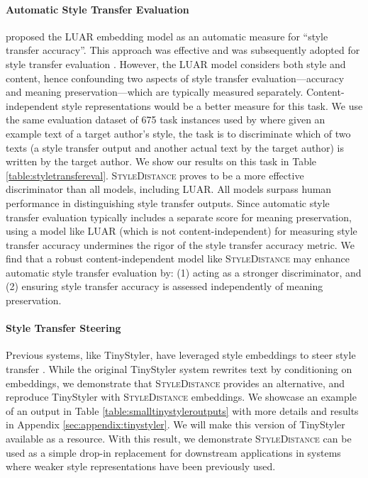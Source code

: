 \paragraph{Automatic Style Transfer Evaluation} \citet{lowresourceauthorshipstyletransfer} proposed the LUAR embedding model as an automatic measure for ``style transfer accuracy''. This approach was effective and was subsequently adopted for style transfer evaluation \citep{astropop,paraguide,tinystyler}. However, the LUAR model considers both style and content, hence confounding two aspects of style transfer evaluation---accuracy and meaning preservation---which are typically measured separately. Content-independent style representations would be a better measure for this task. We use the same evaluation dataset of 675 task instances used by  \citet{lowresourceauthorshipstyletransfer} where given an example text of a target author's style, the task is to discriminate which of two texts (a style transfer output and another actual text by the target author) is written by the target author. We show our results on this task in Table \ref{table:styletransfereval}. \textsc{StyleDistance} proves to be a more effective discriminator than all models, including LUAR. All models surpass human performance in distinguishing style transfer outputs. Since automatic style transfer evaluation typically includes a separate score for meaning preservation, using a model like LUAR (which is not content-independent) for measuring style transfer accuracy undermines the rigor of the style transfer accuracy metric. We find that a robust content-independent model like \textsc{StyleDistance} may enhance automatic style transfer evaluation by: (1) acting as a stronger discriminator, and (2) ensuring style transfer accuracy is assessed independently of meaning preservation.

\paragraph{Style Transfer Steering} Previous systems, like TinyStyler, have leveraged style embeddings to steer style transfer \citep{tinystyler}. While the original TinyStyler system rewrites text by conditioning on \citet{styleemb} embeddings, we demonstrate that \textsc{StyleDistance} provides an alternative, and reproduce TinyStyler with \textsc{StyleDistance} embeddings. We showcase an example of an output in Table \ref{table:smalltinystyleroutputs} with more details and results in Appendix \ref{sec:appendix:tinystyler}. We will make this version of TinyStyler available as a resource. With this result, we demonstrate \textsc{StyleDistance} can be used as a simple drop-in replacement for downstream applications in systems where weaker style representations have been previously used.
\styletransferevaltable
\smalltinystyleroutputs
